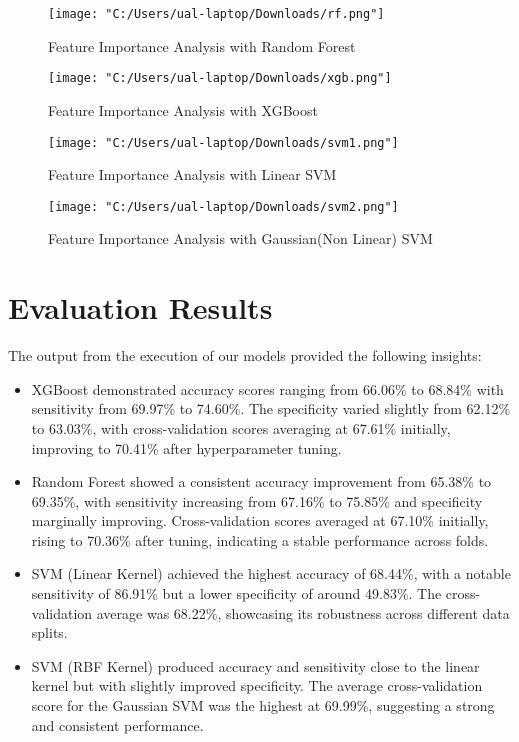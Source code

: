 \documentclass[12pt]{article}
\begin{document}
\bigskip %
\begin{figure}[!htbp]
\centering
\texttt{[image: "C:/Users/ual-laptop/Downloads/rf.png"]}
\caption{Feature Importance Analysis with Random Forest}
\label{fig:graph1}
\end{figure}

\begin{figure}[!htbp]
\centering
\texttt{[image: "C:/Users/ual-laptop/Downloads/xgb.png"]}
\caption{Feature Importance Analysis with XGBoost}
\label{fig:graph2}
\end{figure}

\begin{figure}[!htbp]
\centering
\texttt{[image: "C:/Users/ual-laptop/Downloads/svm1.png"]}
\caption{Feature Importance Analysis with Linear SVM}
\label{fig:graph3}
\end{figure}

\begin{figure}[!htbp]
\centering
\texttt{[image: "C:/Users/ual-laptop/Downloads/svm2.png"]}
\caption{Feature Importance Analysis with Gaussian(Non Linear) SVM}
\label{fig:graph4}
\end{figure}

\clearpage

\section*{Evaluation Results}
The output from the execution of our models provided the following insights:

\medskip
\begin{itemize}
    \item XGBoost demonstrated accuracy scores ranging from 66.06\% to 68.84\% with sensitivity from 69.97\% to 74.60\%. The specificity varied slightly from 62.12\% to 63.03\%, with cross-validation scores averaging at 67.61\% initially, improving to 70.41\% after hyperparameter tuning.
    \item Random Forest showed a consistent accuracy improvement from 65.38\% to 69.35\%, with sensitivity increasing from 67.16\% to 75.85\% and specificity marginally improving. Cross-validation scores averaged at 67.10\% initially, rising to 70.36\% after tuning, indicating a stable performance across folds.
    \item SVM (Linear Kernel) achieved the highest accuracy of 68.44\%, with a notable sensitivity of 86.91\% but a lower specificity of around 49.83\%. The cross-validation average was 68.22\%, showcasing its robustness across different data splits.
    \item SVM (RBF Kernel) produced accuracy and sensitivity close to the linear kernel but with slightly improved specificity. The average cross-validation score for the Gaussian SVM was the highest at 69.99\%, suggesting a strong and consistent performance.
\end{itemize}
\end{document}
